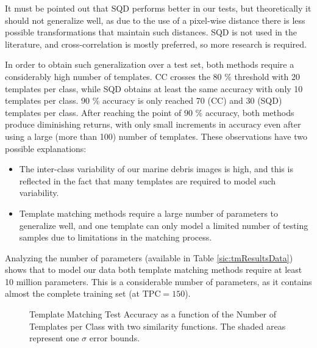 It must be pointed out that SQD performs better in our tests, but theoretically it should not generalize well, as due to the use of a pixel-wise distance there is less possible transformations that maintain such distances. SQD is not used in the literature, and cross-correlation is mostly preferred, so more research is required.

In order to obtain such generalization over a test set, both methods require a considerably high number of templates. CC crosses the $80$ \% threshold with 20 templates per class, while SQD obtains at least the same accuracy with only 10 templates per class. $90$ \% accuracy is only reached 70 (CC) and 30 (SQD) templates per class. After reaching the point of $90$ \% accuracy, both methods produce diminishing returns, with only small increments in accuracy even after using a large (more than 100) number of templates. These observations have two possible explanations:

\begin{itemize}
	\item The inter-class variability of our marine debris images is high, and this is reflected in the fact that many templates are required to model such variability.
	\item Template matching methods require a large number of parameters to generalize well, and one template can only model a limited number of testing samples due to limitations in the matching process.
\end{itemize}

Analyzing the number of parameters (available in Table \ref{sic:tmResultsData}) shows that to model our data both template matching methods require at least 10 million parameters. This is a considerable number of parameters, as it contains almost the complete training set (at $\text{TPC} = 150$).

\begin{figure}
	\centering
	\caption[Template Matching Test Accuracy as a function of the TPC with two similarity functions]{Template Matching Test Accuracy as a function of the Number of Templates per Class with two similarity functions. The shaded areas represent one $\sigma$ error bounds.}
	\label{sic:tmAccVsTSPC}
\end{figure}

